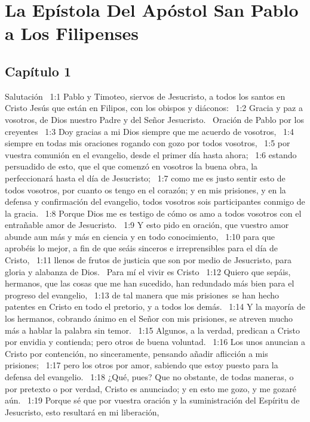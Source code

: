 \chapter{La Epístola Del Apóstol San Pablo a Los Filipenses}



\section*{Capítulo 1}
Salutación  
1:1 Pablo y Timoteo, siervos de Jesucristo, a todos los santos en Cristo Jesús que están en Filipos, con los obispos y diáconos:  
1:2 Gracia y paz a vosotros, de Dios nuestro Padre y del Señor Jesucristo.  
Oración de Pablo por los creyentes  
1:3 Doy gracias a mi Dios siempre que me acuerdo de vosotros,  
1:4 siempre en todas mis oraciones rogando con gozo por todos vosotros,  
1:5 por vuestra comunión en el evangelio, desde el primer día hasta ahora;  
1:6 estando persuadido de esto, que el que comenzó en vosotros la buena obra, la perfeccionará hasta el día de Jesucristo;  
1:7 como me es justo sentir esto de todos vosotros, por cuanto os tengo en el corazón; y en mis prisiones, y en la defensa y confirmación del evangelio, todos vosotros sois participantes conmigo de la gracia.  
1:8 Porque Dios me es testigo de cómo os amo a todos vosotros con el entrañable amor de Jesucristo.  
1:9 Y esto pido en oración, que vuestro amor abunde aun más y más en ciencia y en todo conocimiento,  
1:10 para que aprobéis lo mejor, a fin de que seáis sinceros e irreprensibles para el día de Cristo,  
1:11 llenos de frutos de justicia que son por medio de Jesucristo, para gloria y alabanza de Dios.  
Para mí el vivir es Cristo  
1:12 Quiero que sepáis, hermanos, que las cosas que me han sucedido, han redundado más bien para el progreso del evangelio,  
1:13 de tal manera que mis prisiones se han hecho patentes en Cristo en todo el pretorio, y a todos los demás.  
1:14 Y la mayoría de los hermanos, cobrando ánimo en el Señor con mis prisiones, se atreven mucho más a hablar la palabra sin temor.  
1:15 Algunos, a la verdad, predican a Cristo por envidia y contienda; pero otros de buena voluntad.  
1:16 Los unos anuncian a Cristo por contención, no sinceramente, pensando añadir aflicción a mis prisiones;  
1:17 pero los otros por amor, sabiendo que estoy puesto para la defensa del evangelio.  
1:18 ¿Qué, pues? Que no obstante, de todas maneras, o por pretexto o por verdad, Cristo es anunciado; y en esto me gozo, y me gozaré aún.  
1:19 Porque sé que por vuestra oración y la suministración del Espíritu de Jesucristo, esto resultará en mi liberación,  
